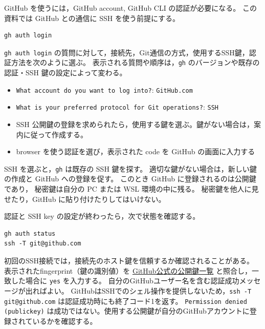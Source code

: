 GitHub を使うには，GitHub account,
GitHub CLI の認証が必要になる。
この資料では GitHub との通信に SSH を使う前提にする。

\begin{lstlisting}[style=codecell]
gh auth login
\end{lstlisting}

\texttt{gh auth login} の質問に対して，接続先，Git通信の方式，使用するSSH鍵，認証方法を次のように選ぶ。
表示される質問や順序は，\texttt{gh} のバージョンや既存の認証・SSH 鍵の設定によって変わる。

\begin{itemize}
\item \texttt{What account do you want to log into?}: \texttt{GitHub.com}

\item \texttt{What is your preferred protocol for Git operations?}: \texttt{SSH}

\item SSH 公開鍵の登録を求められたら，使用する鍵を選ぶ。鍵がない場合は，案内に従って作成する。

\item browser を使う認証を選び，表示された code を GitHub の画面に入力する

\end{itemize}

SSH を選ぶと，\texttt{gh} は既存の SSH 鍵を探す。
適切な鍵がない場合は，新しい鍵の作成と GitHub への登録を促す。
このとき GitHub に登録されるのは公開鍵であり，
秘密鍵は自分の PC または WSL 環境の中に残る。
秘密鍵を他人に見せたり，GitHub に貼り付けたりしてはいけない。

認証と SSH key の設定が終わったら，次で状態を確認する。

\begin{lstlisting}[style=codecell]
gh auth status
ssh -T git@github.com
\end{lstlisting}

初回のSSH接続では，接続先のホスト鍵を信頼するか確認されることがある。
表示されたfingerprint（鍵の識別値）を \href{https://docs.github.com/en/authentication/keeping-your-account-and-data-secure/githubs-ssh-key-fingerprints}{GitHub公式の公開鍵一覧} と照合し，一致した場合に \texttt{yes} を入力する。
自分のGitHubユーザー名を含む認証成功メッセージが出ればよい。
GitHubはSSHでのシェル操作を提供しないため，\texttt{ssh -T git@github.com} は認証成功時にも終了コード1を返す。
\texttt{Permission denied (publickey)} は成功ではない。使用する公開鍵が自分のGitHubアカウントに登録されているかを確認する。

